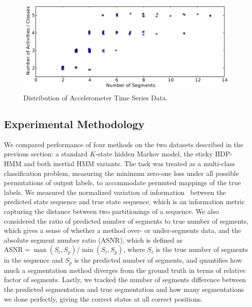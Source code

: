 \documentclass[letterpaper]{article}
\begin{document}
\begin{figure}[htbp]
\setlength{\floatsep}{0cm}
\setlength{\abovecaptionskip}{0pt}
\setlength{\belowcaptionskip}{0cm}
  \centering
    \includegraphics[width=1.\linewidth]{images/distribution_of_dataset_segments.pdf}
    \caption{\small{Distribution of Accelerometer Time Series Data.}}
  \label{fig:distribution}
\end{figure}

\subsection{Experimental Methodology}

We compared performance of four methods on the two datasets described in the previous
section: a standard $K$-state hidden Markov model, the sticky HDP-HMM and both inertial HMM variants. 
The task was treated as a multi-class classification problem, measuring the minimum
zero-one loss under all possible permutations of output labels, to accommodate
permuted mappings of the true labels. We measured the normalized variation of 
information~\cite{meila} between the predicted state sequence and true state sequence, 
which is an information metric capturing the distance between two
partitionings of a sequence. We also considered the ratio of predicted number of segments 
to true number of segments, which gives a sense of whether a method over- or under-segments data, and the
absolute segment number ratio (ASNR), which is defined as
$\text{ASNR} = \max(S_t, S_p)/\min(S_t, S_p)$, 
where $S_t$ is the true number of segments in the sequence and $S_p$ is the predicted number of segments, and quantifies how much a segmentation method diverges from the ground truth in terms of relative factor of segments. Lastly, we tracked the number of segments difference between the predicted segmentation and true segmentation and how many segmentations we done perfectly, giving the correct states at all correct positions.
\end{document}
